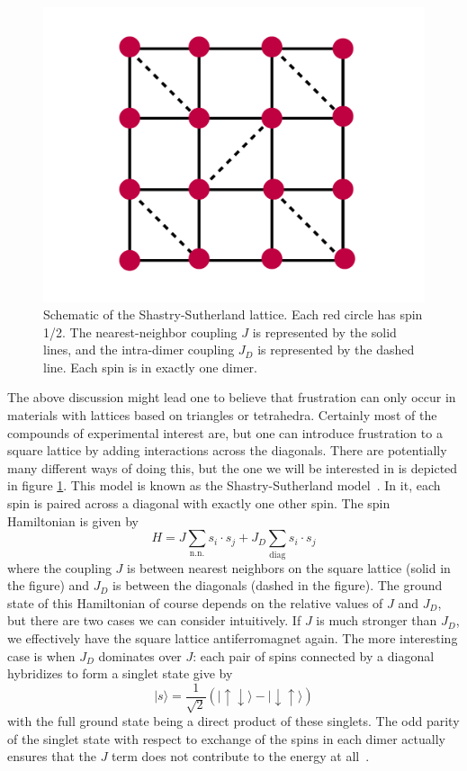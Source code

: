 \documentclass{thesis-umich}
\begin{document}
\begin{figure}
	\caption[The Shastry-Sutherland Lattice]{Schematic of the Shastry-Sutherland lattice. Each red circle has spin 1/2. The nearest-neighbor coupling $J$ is represented by the solid lines, and the intra-dimer coupling $J_D$ is represented by the dashed line. Each spin is in exactly one dimer.}
	\label{fig:shastry-sutherland}
	\includegraphics[width=\columnwidth]{figures/ss-model.pdf}
\end{figure}

The above discussion might lead one to believe that frustration can only occur in materials with lattices based on triangles or tetrahedra. Certainly most of the compounds of experimental interest are, but one can introduce frustration to a square lattice by adding interactions across the diagonals. There are potentially many different ways of doing this, but the one we will be interested in is depicted in figure \ref{fig:shastry-sutherland}. This model is known as the Shastry-Sutherland model~\cite{Kageyama2005}. In it, each spin is paired across a diagonal with exactly one other spin. The spin Hamiltonian is given by
\[H = J \sum_{\mathrm{n.n.}}s_i \cdot s_j + J_D\sum_{\mathrm{diag}}s_i \cdot s_j\]
where the coupling $J$ is between nearest neighbors on the square lattice (solid in the figure) and $J_D$ is between the diagonals (dashed in the figure). The ground state of this Hamiltonian of course depends on the relative values of $J$ and $J_D$, but there are two cases we can consider intuitively. If $J$ is much stronger than $J_D$, we effectively have the square lattice antiferromagnet again. The more interesting case is when $J_D$ dominates over $J$: each pair of spins connected by a diagonal hybridizes to form a singlet state give by
\[ | s \rangle = \frac{1}{\sqrt{2}}(|\uparrow \downarrow \rangle - | \downarrow \uparrow \rangle) \]
with the full ground state being a direct product of these singlets. The odd parity of the singlet state with respect to exchange of the spins in each dimer actually ensures that the $J$ term does not contribute to the energy at all~\cite{Miyahara1999}. 
\end{document}
